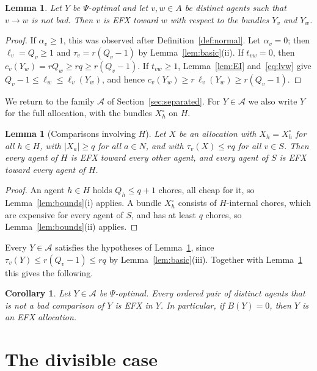 \documentclass{amsart}
\numberwithin{equation}{section}
\newtheorem{lemma}[theorem]{Lemma}
\newtheorem{corollary}[theorem]{Corollary}
\theoremstyle{definition}
\theoremstyle{remark}
\newcommand{\cA}{\mathcal{A}}
\begin{document}
\begin{lemma}\label{lem:localEFX}
Let $Y$ be $\Psi$-optimal and let $v,w\in A$ be distinct agents such that $v\to w$ is not bad. Then $v$ is EFX toward $w$ with respect to the bundles $Y_v$ and $Y_w$.
\end{lemma}

\begin{proof}
If $\alpha_v\ge1$, this was observed after Definition~\ref{def:normal}. Let $\alpha_v=0$; then $\ell_v=Q_v\ge1$ and $\tau_v=r(Q_v-1)$ by Lemma~\ref{lem:basic}(ii). If $t_{vw}=0$, then $c_v(Y_w)=rQ_w\ge rq\ge r(Q_v-1)$. If $t_{vw}\ge1$, Lemma~\ref{lem:EI} and~\eqref{eq:lvw} give $Q_v-1\le\ell_w\le\ell_v(Y_w)$, and hence $c_v(Y_w)\ge r\,\ell_v(Y_w)\ge r(Q_v-1)$.
\end{proof}

We return to the family $\cA$ of Section~\ref{sec:separated}. For $Y\in\cA$ we also write $Y$ for the full allocation, with the bundles $X^\circ_h$ on $H$.

\begin{lemma}[Comparisons involving $H$]\label{lem:closing}
Let $X$ be an allocation with $X_h=X^\circ_h$ for all $h\in H$, with $|X_a|\ge q$ for all $a\in N$, and with $\tau_v(X)\le rq$ for all $v\in S$. Then every agent of $H$ is EFX toward every other agent, and every agent of $S$ is EFX toward every agent of $H$.
\end{lemma}

\begin{proof}
An agent $h\in H$ holds $Q_h\le q+1$ chores, all cheap for it, so Lemma~\ref{lem:bounds}(i) applies. A bundle $X^\circ_h$ consists of $H$-internal chores, which are expensive for every agent of $S$, and has at least $q$ chores, so Lemma~\ref{lem:bounds}(ii) applies.
\end{proof}

Every $Y\in\cA$ satisfies the hypotheses of Lemma~\ref{lem:closing}, since $\tau_v(Y)\le r(Q_v-1)\le rq$ by Lemma~\ref{lem:basic}(iii). Together with Lemma~\ref{lem:localEFX} this gives the following.

\begin{corollary}\label{cor:B0}
Let $Y\in\cA$ be $\Psi$-optimal. Every ordered pair of distinct agents that is not a bad comparison of $Y$ is EFX in $Y$. In particular, if $B(Y)=0$, then $Y$ is an EFX allocation.
\end{corollary}

\section{The divisible case}\label{sec:divisible}
\end{document}
